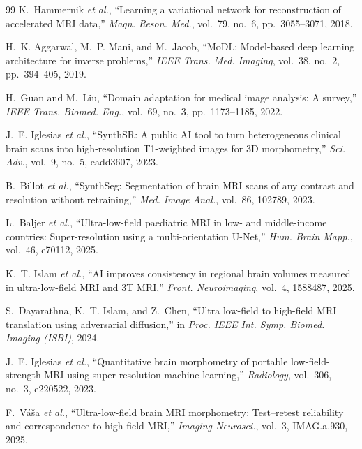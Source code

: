 \begin{thebibliography}{99}
K.~Hammernik \textit{et al.},
``Learning a variational network for reconstruction of accelerated MRI data,''
\textit{Magn. Reson. Med.}, vol.~79, no.~6, pp.~3055--3071, 2018.

H.~K. Aggarwal, M.~P. Mani, and M.~Jacob,
``MoDL: Model-based deep learning architecture for inverse problems,''
\textit{IEEE Trans. Med. Imaging}, vol.~38, no.~2, pp.~394--405, 2019.

H.~Guan and M.~Liu,
``Domain adaptation for medical image analysis: A survey,''
\textit{IEEE Trans. Biomed. Eng.}, vol.~69, no.~3, pp.~1173--1185, 2022.

J.~E. Iglesias \textit{et al.},
``SynthSR: A public AI tool to turn heterogeneous clinical brain scans into high-resolution T1-weighted images for 3D morphometry,''
\textit{Sci. Adv.}, vol.~9, no.~5, eadd3607, 2023.

B.~Billot \textit{et al.},
``SynthSeg: Segmentation of brain MRI scans of any contrast and resolution without retraining,''
\textit{Med. Image Anal.}, vol.~86, 102789, 2023.

L.~Baljer \textit{et al.},
``Ultra-low-field paediatric MRI in low- and middle-income countries: Super-resolution using a multi-orientation U-Net,''
\textit{Hum. Brain Mapp.}, vol.~46, e70112, 2025.

K.~T. Islam \textit{et al.},
``AI improves consistency in regional brain volumes measured in ultra-low-field MRI and 3T MRI,''
\textit{Front. Neuroimaging}, vol.~4, 1588487, 2025.

S.~Dayarathna, K.~T. Islam, and Z.~Chen,
``Ultra low-field to high-field MRI translation using adversarial diffusion,''
in \textit{Proc. IEEE Int. Symp. Biomed. Imaging (ISBI)}, 2024.

J.~E. Iglesias \textit{et al.},
``Quantitative brain morphometry of portable low-field-strength MRI using super-resolution machine learning,''
\textit{Radiology}, vol.~306, no.~3, e220522, 2023.

F.~V\'{a}\v{s}a \textit{et al.},
``Ultra-low-field brain MRI morphometry: Test--retest reliability and correspondence to high-field MRI,''
\textit{Imaging Neurosci.}, vol.~3, IMAG.a.930, 2025.


\end{thebibliography}
